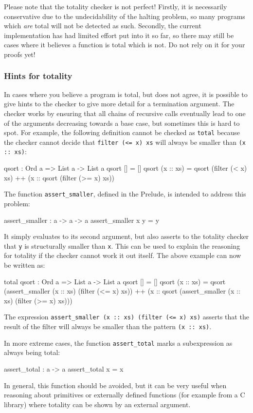 Please note that the totality checker is not perfect! Firstly, it is necessarily
conservative due to the undecidability of the halting problem, so many programs
which \emph{are} total will not be detected as such. Secondly, the current
implementation has had limited effort put into it so far, so there may still
be cases where it believes a function is total which is not. Do not rely on it
for your proofs yet!

\subsubsection{Hints for totality}

In cases where you believe a program is total, but \Idris{} does not agree,
it is possible to give hints to the checker to give more detail for a
termination argument. The checker works by ensuring that all chains of
recursive calls eventually lead to one of the arguments decreasing towards
a base case, but sometimes this is hard to spot. For example, the following
definition cannot be checked as \texttt{total} because the checker cannot
decide that \texttt{filter (<= x) xs} will always be smaller than \texttt{(x :: xs)}:

\begin{code}
qsort : Ord a => List a -> List a
qsort [] = []
qsort (x :: xs)
   = qsort (filter (< x) xs) ++
      (x :: qsort (filter (>= x) xs))
\end{code}

\noindent
The function \texttt{assert\_smaller}, defined in the Prelude,
is intended to address this problem:

\begin{code}
assert_smaller : a -> a -> a
assert_smaller x y = y
\end{code}

\noindent
It simply evaluates to its second argument, but also asserts to the totality
checker that \texttt{y} is structurally smaller than \texttt{x}.  This can be
used to explain the reasoning for totality if the checker cannot work it out
itself. The above example can now be written as:

\begin{code}
total
qsort : Ord a => List a -> List a
qsort [] = []
qsort (x :: xs)
   = qsort (assert_smaller (x :: xs) (filter (<= x) xs)) ++
      (x :: qsort (assert_smaller (x :: xs) (filter (>= x) xs)))
\end{code}

\noindent
The expression \texttt{assert\_smaller (x :: xs) (filter (<= x) xs)} asserts
that the result of the filter will always be smaller than the pattern
\texttt{(x :: xs)}.

In more extreme cases, the function \texttt{assert\_total} marks a
subexpression as always being total:

\begin{code}
assert_total : a -> a
assert_total x = x
\end{code}

\noindent
In general, this function should be avoided, but it can be very useful when
reasoning about primitives or externally defined functions (for example from
a C library) where totality can be shown by an external argument.
